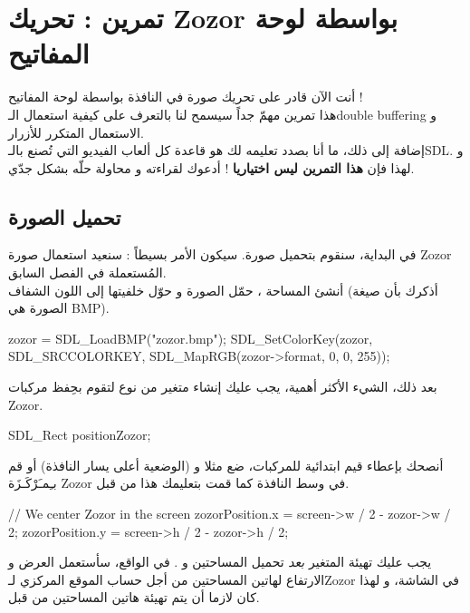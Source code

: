 \section{تمرين : تحريك \textenglish{Zozor} بواسطة لوحة المفاتيح}

أنت الآن قادر على تحريك صورة في النافذة بواسطة لوحة المفاتيح !\\
هذا تمرين مهمّ جداً سيسمح لنا بالتعرف على كيفية استعمال الـ\textenglish{double buffering}
و الاستعمال المتكرر للأزرار.\\
إضافة إلى ذلك، ما أنا بصدد تعليمه لك هو قاعدة كل ألعاب الفيديو التي تُصنع بالـ\textenglish{SDL}.
و لهذا فإن
\textbf{هذا التمرين ليس اختياريا}
! أدعوك لقراءته و محاولة حلّه بشكل جدّي.

\subsection{تحميل الصورة}

في البداية، سنقوم بتحميل صورة. سيكون الأمر بسيطاً : سنعيد استعمال صورة 
\textenglish{Zozor}
المُستعملة في الفصل السابق.\\
أنشئ المساحة
،
حمّل الصورة و حوّل خلفيتها إلى اللون الشفاف (أذكرك بأن صيغة الصورة هي 
\textenglish{BMP}).

\begin{Csource}
zozor = SDL_LoadBMP("zozor.bmp");
SDL_SetColorKey(zozor, SDL_SRCCOLORKEY, SDL_MapRGB(zozor->format, 0, 0, 255));
\end{Csource}

بعد ذلك، الشيء الأكثر أهمية، يجب عليك إنشاء متغير من نوع
لتقوم بحِفظ مركبات
\textenglish{Zozor}.

\begin{Csource}
SDL_Rect positionZozor;
\end{Csource}

أنصحك بإعطاء قيم ابتدائية للمركبات، ضع مثلا
و 
(الوضعية أعلى يسار النافذة) أو قم بـِمـَرْكَـزَة
\textenglish{Zozor}
في وسط النافذة كما قمت بتعليمك هذا من قبل.

\begin{Csource}
// We center Zozor in the screen
zozorPosition.x = screen->w / 2 - zozor->w / 2;
zozorPosition.y = screen->h / 2 - zozor->h / 2;
\end{Csource}

\begin{critical}
يجب عليك تهيئة المتغير 
\textit{بعد}
تحميل المساحتين 
و 
.
في الواقع، سأستعمل العرض 
و الارتفاع 
لهاتين المساحتين من أجل حساب الموقع المركزي لـ\textenglish{Zozor}
في الشاشة، و لهذا كان لازما أن يتم تهيئة هاتين المساحتين من قبل.
\end{critical}

